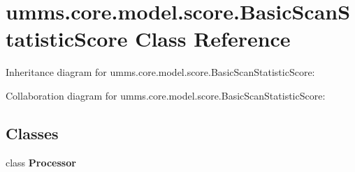 \hypertarget{classumms_1_1core_1_1model_1_1score_1_1_basic_scan_statistic_score}{\section{umms.\+core.\+model.\+score.\+Basic\+Scan\+Statistic\+Score Class Reference}
\label{classumms_1_1core_1_1model_1_1score_1_1_basic_scan_statistic_score}
}


Inheritance diagram for umms.\+core.\+model.\+score.\+Basic\+Scan\+Statistic\+Score\+:


Collaboration diagram for umms.\+core.\+model.\+score.\+Basic\+Scan\+Statistic\+Score\+:
\subsection*{Classes}
\begin{DoxyCompactItemize}
\item 
class {\bfseries Processor}
\end{DoxyCompactItemize}
